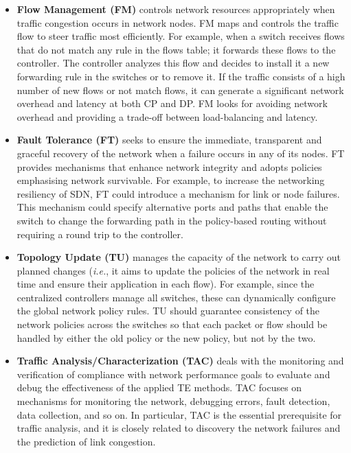 \begin{itemize}
    \item 
    \textbf{Flow Management (FM)} controls network resources appropriately when traffic congestion occurs in network nodes. FM maps and controls the traffic flow to steer traffic most efficiently. For example, when a switch receives flows that do not match any rule in the flows table; it forwards these flows to the controller. The controller analyzes this flow and decides to install it a new forwarding rule in the switches or to remove it. If the traffic consists of a high number of new flows or not match flows, it can generate a significant network overhead and latency at both CP and DP. FM looks for avoiding network overhead and providing a trade-off between load-balancing and latency.
    \item 
    \textbf{Fault Tolerance (FT)} seeks to ensure the immediate, transparent and graceful recovery of the network when a failure occurs in any of its nodes. FT provides mechanisms that enhance network integrity and adopts policies emphasising network survivable. For example, to increase the networking resiliency of SDN, FT could introduce a mechanism for link or node failures. This mechanism could specify alternative ports and paths that enable the switch to change the forwarding path in the policy-based routing without requiring a round trip to the controller.
    \item 
    \textbf{Topology Update (TU)} manages the capacity of the network to carry out planned changes (\textit{i.e.}, it aims to update the policies of the network in real time and ensure their application in each flow). For example, since the centralized controllers manage all switches, these can dynamically configure the global network policy rules. TU should guarantee consistency of the network policies across the switches so that each packet or flow should be handled by either the old policy or the new policy, but not by the two.
    \item 
    \textbf{Traffic Analysis/Characterization (TAC)} deals with the monitoring and verification of compliance with network performance goals to evaluate and debug the effectiveness of the applied TE methods. TAC focuses on mechanisms for monitoring the network, debugging errors, fault detection, data collection, and so on. In particular, TAC is the essential prerequisite for traffic analysis, and it is closely related to discovery the network failures and the prediction of link congestion.
\end{itemize}

